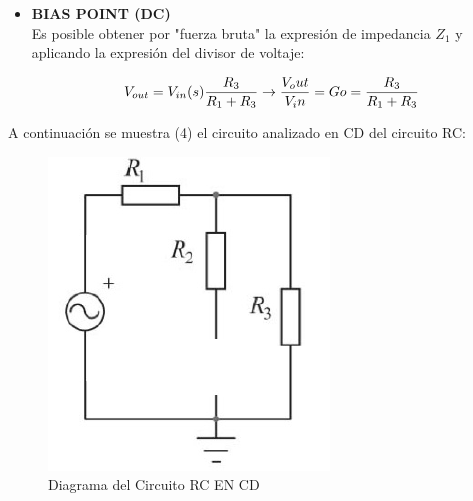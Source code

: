 \documentclass[letterpaper,10pt]{article}
\begin{document}
     \begin{itemize}
    	\item
    	\textbf{BIAS POINT (DC)}\vspace*{0.4in}\\
		Es posible obtener por "fuerza bruta" la expresión de impedancia $Z_1$ y
		aplicando la expresión del divisor de voltaje:
		
   		\begin{equation}
		V_{out} = V_{in}(s) \frac {R_3}{R_1 + R_3}\rightarrow \frac {V_out}{V_in}= Go= \frac {R_3}{R_1 + R_3}\\  
		\end{equation}
     \end{itemize}

	\pagebreak
	A continuación se muestra (4) el circuito analizado en CD del circuito RC:
	\vspace*{0.3in}
    \begin{figure}[h!]
    	\centering
    	\includegraphics[scale=0.7]{CIRCUITORCDC}
    	\caption{Diagrama del Circuito RC EN CD}
    \end{figure}
\end{document}
